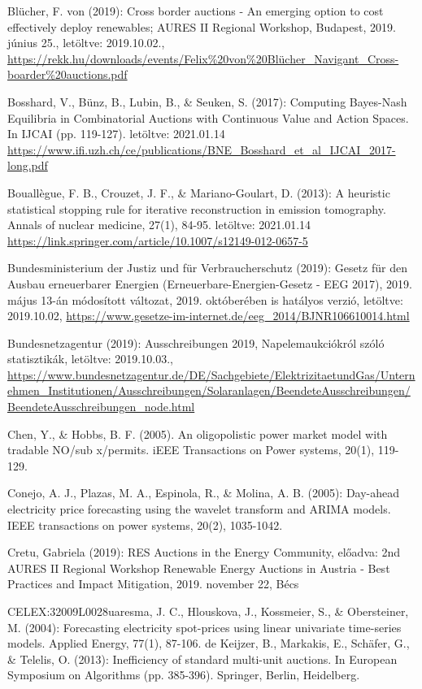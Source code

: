 \documentclass[twoside, magyar, showtrims]{corvinusphd}
\theoremstyle{plain}
\theoremstyle{remark}
\theoremstyle{definition}
\begin{document}
\begin{thebibliography}{99}
Blücher, F. von (2019): Cross border auctions - An emerging option to cost effectively deploy renewables; AURES II Regional Workshop, Budapest, 2019. június 25., letöltve: 2019.10.02., 
\url{https://rekk.hu/downloads/events/Felix\%20von\%20Blücher\_Navigant\_Cross-boarder\%20auctions.pdf}

Bosshard, V., Bünz, B., Lubin, B., \& Seuken, S. (2017): Computing Bayes-Nash Equilibria in Combinatorial Auctions with Continuous Value and Action Spaces. In IJCAI (pp. 119-127).
letöltve: 2021.01.14
\url{https://www.ifi.uzh.ch/ce/publications/BNE\_Bosshard\_et\_al\_IJCAI\_2017-long.pdf}

Bouallègue, F. B., Crouzet, J. F., \& Mariano-Goulart, D. (2013): A heuristic statistical stopping rule for iterative reconstruction in emission tomography. Annals of nuclear medicine, 27(1), 84-95.
letöltve: 2021.01.14
\url{https://link.springer.com/article/10.1007/s12149-012-0657-5}

Bundesministerium der Justiz und für Verbraucherschutz (2019): Gesetz für den Ausbau erneuerbarer Energien (Erneuerbare-Energien-Gesetz - EEG 2017), 2019. május 13-án módosított változat, 2019. októberében is hatályos verzió, letöltve: 2019.10.02, 
\url{https://www.gesetze-im-internet.de/eeg\_2014/BJNR106610014.html}

Bundesnetzagentur (2019): Ausschreibungen 2019, Napelemaukciókról szóló statisztikák, letöltve: 2019.10.03., 
\url{https://www.bundesnetzagentur.de/DE/Sachgebiete/ElektrizitaetundGas/Unternehmen\_Institutionen/Ausschreibungen/Solaranlagen/BeendeteAusschreibungen/BeendeteAusschreibungen\_node.html}

Chen, Y., \& Hobbs, B. F. (2005). An oligopolistic power market model with tradable NO/sub x/permits. iEEE Transactions on Power systems, 20(1), 119-129.

Conejo, A. J., Plazas, M. A., Espinola, R., \& Molina, A. B. (2005): Day-ahead electricity price forecasting using the wavelet transform and ARIMA models. IEEE transactions on power systems, 20(2), 1035-1042.

Cretu, Gabriela (2019): RES Auctions in the Energy Community, előadva: 2nd AURES II Regional Workshop Renewable Energy Auctions in Austria - Best Practices and Impact Mitigation, 2019. november 22, Bécs

CELEX:32009L0028uaresma, J. C., Hlouskova, J., Kossmeier, S., \& Obersteiner, M. (2004): Forecasting electricity spot-prices using linear univariate time-series models. Applied Energy, 77(1), 87-106.
de Keijzer, B., Markakis, E., Schäfer, G., \& Telelis, O. (2013): Inefficiency of standard multi-unit auctions. In European Symposium on Algorithms (pp. 385-396). Springer, Berlin, Heidelberg.


\end{thebibliography}
\end{document}
